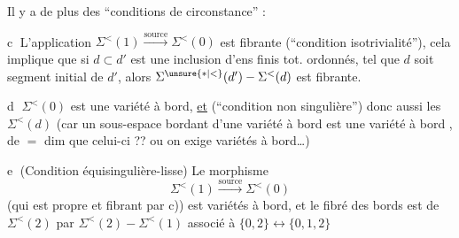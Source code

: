 Il y a de plus des ``conditions de circonstance'' :

\textcircled{c} L'application $\Sigma^{<}(1)\xrightarrow{\mathrm{source}}\Sigma^{<}(0)$ est  fibrante (``condition isotrivialité''), cela implique que  si $d\subset d'$ est une inclusion d'ens finis tot. ordonnés, tel que $d$ soit segment initial de $d'$, alors $\Sigma^{\unsure{*|<}}(d')-\Sigma^{<}(d)$ est fibrante.

\textcircled{d}  $\Sigma^{<}(0)$ est  une variété à bord, \uline{et}  (``condition non singulière'') donc aussi les $\Sigma^{<}(d)$ (car un sous-espace bordant d'une variété à bord est une variété à bord  , de $=$ dim que celui-ci ?? \unsure{\}} ou on exige   variétés à bord\ldots)

\textcircled{e} (Condition   équisingulière-lisse)
 Le morphisme
\[
\Sigma^{<}(1)\xrightarrow{\mathrm{source}}\Sigma^{<}(0)
\]
(qui est propre et fibrant par c))  est  variétés à bord, et le fibré des bords est   de $\Sigma^{<}(2)$ par $\Sigma^{<}(2)-\Sigma^{<}(1)$ associé à $\{0,2\}\longleftrightarrow\{0,1,2\}$
